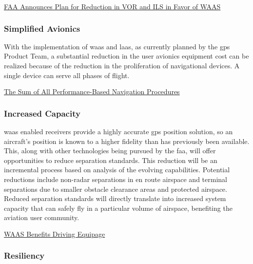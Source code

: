 \href{https://www.uasc.com/docs/default-source/documents/universalflyer/uasc_universalflyer_20122q.pdf?sfvrsn=e717985c_2}{FAA
Announces Plan for Reduction in VOR and ILS in Favor of WAAS}

\subsubsection{Simplified Avionics}\label{simplified-avionics}

With the implementation of \ac{waas} and \ac{laas}, as currently planned by the \ac{gps} Product Team, a substantial reduction in the user avionics equipment cost can be realized because of the reduction in the proliferation of navigational devices. A single device can serve all phases of flight.

\href{https://www.faa.gov/about/office_org/headquarters_offices/ato/service_units/techops/navservices/gnss/library/satnav/media/SatNavNews_Summer_2017.pdf}{The
Sum of All Performance-Based Navigation Procedures}

\subsubsection{Increased Capacity}\label{increased-capacity}

\ac{waas} enabled receivers provide a highly accurate \ac{gps} position solution,
so an aircraft's position is known to a higher fidelity than has
previously been available. This, along with other technologies being
pursued by the \ac{faa}, will offer opportunities to reduce separation
standards. This reduction will be an incremental process based on
analysis of the evolving capabilities. Potential reductions include
non-radar separations in en route airspace and terminal separations due
to smaller obstacle clearance areas and protected airspace. Reduced
separation standards will directly translate into increased system
capacity that can safely fly in a particular volume of airspace,
benefiting the aviation user community.

\href{https://www.faa.gov/about/office_org/headquarters_offices/ato/service_units/techops/navservices/gnss/library/satnav/media/SatNavNews_Spring2014_final_web.pdf}{WAAS
Benefits Driving Equipage}

\subsubsection{Resiliency}\label{resiliency}

